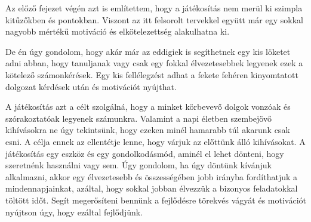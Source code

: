 Az előző fejezet végén azt is említettem, hogy a játékosítás nem merül ki szimpla kitűzőkben és pontokban. Viszont az itt felsorolt tervekkel együtt már egy sokkal nagyobb mértékű motiváció és elkötelezettség alakulhatna ki. \newline

De én úgy gondolom, hogy akár már az eddigiek is segíthetnek egy kis löketet adni abban, hogy tanuljanak vagy csak egy fokkal élvezetesebbek legyenek ezek a kötelező számonkérések. Egy kis fellélegzést adhat a fekete fehéren kinyomtatott dolgozat kérdések után és motivációt nyújthat. \newline

A játékosítás azt a célt szolgálná, hogy a minket körbevevő dolgok vonzóak és szórakoztatóak legyenek számunkra. Valamint a napi életben szembejövő kihívásokra ne úgy tekintsünk, hogy ezeken minél hamarabb túl akarunk csak esni. A célja ennek az ellentétje lenne, hogy várjuk az előttünk álló kihívásokat. A játékosítás egy eszköz és egy gondolkodásmód, aminél el lehet dönteni, hogy szeretnénk használni vagy sem. Úgy gondolom, ha úgy döntünk kívánjuk alkalmazni, akkor egy élvezetesebb és összességében jobb irányba fordíthatjuk a mindennapjainkat, azáltal, hogy sokkal jobban élvezzük a bizonyos feladatokkal töltött időt. Segít megerősíteni bennünk a fejlődésre törekvés vágyát és motivációt nyújtson úgy, hogy ezáltal fejlődjünk.